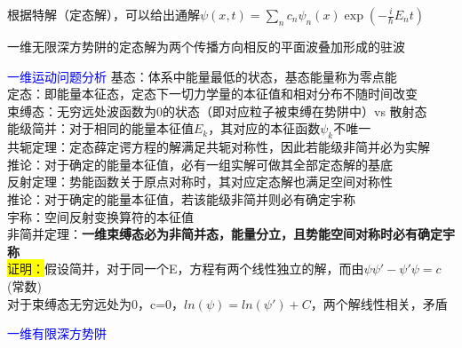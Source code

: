 \documentclass[a4paper,8pt]{extarticle} %
\newcommand{\bluetext}[1]{\textcolor{blue}{#1}}
\newcommand{\yellowback}[1]{\colorbox{yellow}{#1}}
\newcommand{\black}[1]{\textbf{#1}}
\begin{document}
\begin{multicols}{3}
根据特解（定态解），可以给出通解$\psi(x,t) = \sum_n c_n\psi_n(x)\exp(-\frac{i}{\hbar}E_nt)$ \hspace{2em} 

一维无限深方势阱的定态解为两个传播方向相反的平面波叠加形成的驻波

\bluetext{一维运动问题分析}
基态：体系中能量最低的状态，基态能量称为零点能\\
定态：即能量本征态，定态下一切力学量的本征值和相对分布不随时间改变\\
束缚态：无穷远处波函数为0的状态（即对应粒子被束缚在势阱中）vs 散射态\\
能级简并：对于相同的能量本征值$E_k$，其对应的本征函数$\psi_k$不唯一\\
共轭定理：定态薛定谔方程的解满足共轭对称性，因此若能级非简并必为实解\\
推论：对于确定的能量本征值，必有一组实解可做其全部定态解的基底\\
反射定理：势能函数关于原点对称时，其对应定态解也满足空间对称性\\
推论：对于确定的能量本征值，若该能级非简并则必有确定宇称\\
宇称：空间反射变换算符的本征值\\
非简并定理：\black{一维束缚态必为非简并态，能量分立，且势能空间对称时必有确定宇称}\\
\yellowback{证明：}假设简并，对于同一个E，方程有两个线性独立的解，而由$\psi\psi'-\psi'\psi=c$(常数)\\
对于束缚态无穷远处为0，c=0，$ln(\psi)=ln(\psi')+C$，两个解线性相关，矛盾

\bluetext{一维有限深方势阱}


\end{multicols}
\end{document}
